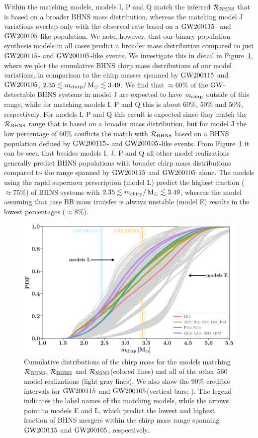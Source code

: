 \documentclass{aastex63}
\newcommand{\Msun}{\ensuremath{\,\rm{M}_{\odot}}\xspace}
\newcommand{\mchirpf}{\ensuremath{{m}_{\rm{chirp}}}\xspace}
\newcommand{\Rbhns}{\ensuremath{\mathcal{R}_{\rm{BHNS}}}\xspace}
\newcommand{\Rbhbh}{\ensuremath{\mathcal{R}_{\rm{BHBH}}}\xspace}
\newcommand{\Rnsns}{\ensuremath{\mathcal{R}_{\rm{NSNS}}}\xspace}
\newcommand{\Nmodels}{\ensuremath{560}\xspace}
\newcommand{\gwone}{\ensuremath{\rm{GW200115}}\xspace}
\newcommand{\gwzero}{\ensuremath{\rm{GW200105}}\xspace}
\begin{document}
Within the matching models, models I, P and Q match the inferred \Rbhns that is based on a broader \ac{BHNS} mass distribution, whereas the matching model J variations overlap only with the observed rate based on a \gwone- and \gwzero-like population. We note, however, that our binary population synthesis models in all cases predict a broader mass distribution compared to just \gwone- and \gwzero-like events.  We investigate this in detail in Figure~\ref{fig:chirp-mass-cdf-matching-models}, where we plot the cumulative \ac{BHNS} chirp mass distributions of our model variations, in comparison to the chirp masses spanned by \gwone and \gwzero, $2.35\lesssim \mchirpf / \Msun \lesssim 3.49$.  We find that $\approx 60\%$ of the \ac{GW}-detectable \ac{BHNS} systems in model J are expected to have \mchirpf outside of this range, while for matching models I, P and Q this is about $60\%$, $50\%$ and $50\%$, respectively. For models I, P and Q this result is expected since they match the \Rbhns range that is based on a broader mass distribution, but for model J the low percentage of $60\%$ conflicts the match with \Rbhns based on a \ac{BHNS} population defined by \gwone- and \gwzero-like events. From Figure~\ref{fig:chirp-mass-cdf-matching-models} it can be seen that besides models I, J, P and Q all other model realizations generally predict \ac{BHNS} populations with broader chirp mass distributions compared to the range spanned by \gwone and \gwzero alone.  The models using the rapid supernova prescription (model L) predict the highest fraction ($\approx 75\%$) of \ac{BHNS} systems with $2.35\lesssim \mchirpf / \Msun \lesssim 3.49$, whereas the model assuming that case BB mass transfer is always unstable (model E) results in the lowest percentages ($\approx 8\%$).




\begin{figure}
    \centering
\includegraphics[width=.75\textwidth]{figures/CDF_matching_models_Mchirp.png}
    \caption{Cumulative distributions of the chirp mass for the models matching \Rbhns, \Rbhbh and \Rnsns (colored lines) and all of the other \Nmodels model realizations (light gray lines). We also show the $90\%$ credible intervals for \gwone and \gwzero (vertical bars; \citealt{Abbott:2021-first-NSBH}). The legend indicates the label names of the matching models, while the arrows point to models E and L, which predict the lowest and highest fraction of \ac{BHNS} mergers within the chirp mass range spanning \gwone and \gwzero, respectively.
    }
    \label{fig:chirp-mass-cdf-matching-models}
\end{figure}
\end{document}

